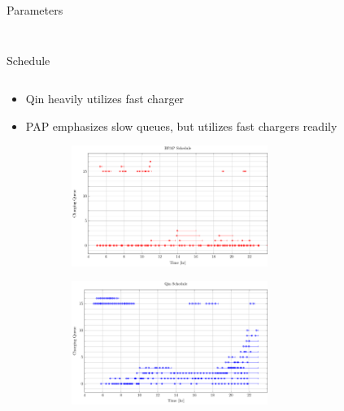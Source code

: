 \documentclass[aspectratio=169]{beamer}
\begin{document}
\begin{frame}[label={sec:orgce56422}]{Parameters}
\begin{columns}
\begin{column}{0.5\columnwidth}
\begin{figure}
{
      }
      \label{fig:spacial-and-temporal-constr}
\end{figure}
\end{column}
\end{columns}
\end{frame}

\begin{frame}[label={sec:org749d91b}]{Schedule}
\begin{columns}
\begin{column}{0.5\columnwidth}
{\scriptsize
\begin{itemize}
\item Qin heavily utilizes fast charger
\item PAP emphasizes slow queues, but utilizes fast chargers readily
\end{itemize}
}

\begin{figure}
\begin{subfigure}[t]{\textwidth}
\centering
    \includegraphics[width=0.7\textwidth]{img/sa-pap-paper-good/schedule-milp}
\end{subfigure}
\begin{subfigure}[t]{\textwidth}
\centering
    \includegraphics[width=0.7\textwidth]{img/sa-pap-paper-good/schedule-qin}
\end{subfigure}
\end{figure}
\end{column}


\end{columns}
\end{frame}
\end{document}
